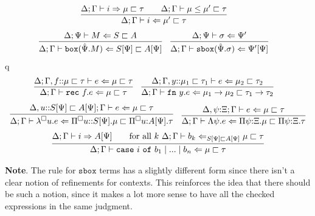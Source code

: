 \documentclass[letterpaper, 11pt]{article}
\newcommand{\Rar}{\Rightarrow}
\newcommand{\Lar}{\Leftarrow}
\newcommand{\rar}{\rightarrow}
\newcommand{\rec}{\texttt{rec}}
\newcommand{\fn}{\texttt{fn}}
\newcommand{\case}{\texttt{case}}
\newcommand{\of}{\texttt{of}}
\newcommand{\bbox}{\texttt{box}}
\newcommand{\sbbox}{\texttt{sbox}}
\begin{document}
    \begin{align*}
      & \infer{ \Delta; \Gamma \vdash i \Lar \mu' \sqsubset \tau}
        {
           \Delta; \Gamma \vdash i \Rar \mu \sqsubset \tau
          &&
           \Delta; \Gamma \vdash \mu \leq \mu' \sqsubset \tau
        } 
    \end{align*}
    \begin{align*}
      & \infer{ \Delta; \Gamma \vdash \bbox(\hat{\Psi}. M) \Lar S[\Psi] \sqsubset A[\Psi]}
            {
              \Delta; \Psi \vdash M \Lar S \sqsubset A
            } &
      & \infer{\Delta; \Gamma \vdash \sbbox(\hat{\Psi}. \sigma) \Lar \Psi'[\Psi]}
            {
              \Delta; \Psi \vdash \sigma \Lar \Psi'
            }
    \end{align*}q
    \begin{align*}
      & \infer{ \Delta; \Gamma \vdash \rec \ f.e \Lar \mu \sqsubset \tau}
        {
           \Delta; \Gamma, f{::}\mu \sqsubset \tau \vdash e \Lar \mu \sqsubset \tau
        } &
      & \infer{ \Delta; \Gamma \vdash \fn \ y.e \Lar \mu_1 \rar \mu_2 \sqsubset \tau_1 \rar \tau_2}
        {
           \Delta; \Gamma, y{::}\mu_1 \sqsubset \tau_1 \vdash e \Lar \mu_2 \sqsubset \tau_2
        }
    \end{align*}
    \begin{align*}
      & \infer{ \Delta; \Gamma \vdash \lambda^\square u.e \Lar \Pi^\square u{::}S[\Psi].\mu \sqsubset \Pi^\square u{:}A[\Psi]. \tau}
        {
           \Delta, u{::}S[\Psi] \sqsubset A[\Psi]; \Gamma \vdash e \Lar \mu \sqsubset \tau
        }
      & \infer{ \Delta; \Gamma \vdash \Lambda \psi. e \Lar \Pi \psi{:}\Xi.\mu \sqsubset \Pi \psi {:} \Xi. \tau}
        {
          \Delta, \psi{:}\Xi; \Gamma \vdash e \Lar \mu \sqsubset \tau
        }
    \end{align*}
    \begin{align*}
      \infer{ \Delta; \Gamma \vdash \case \ i \ \of \ b_1 \mid ... \mid b_n \Lar \mu \sqsubset \tau}
            {
               \Delta; \Gamma \vdash i \Rar A[\Psi]
              &&
              \text{for all } k \  \Delta; \Gamma \vdash b_k \Lar_{S[\Psi] \sqsubset A[\Psi]} \mu \sqsubset \tau
            }
    \end{align*}

    \textbf{Note}.  The rule for $\sbbox$ terms has a slightly different form since there isn't a clear notion of refinements for contexts.  This
    reinforces the idea that there should be such a notion, since it makes a lot more sense to have all the checked expressions in the same judgment.
\end{document}
